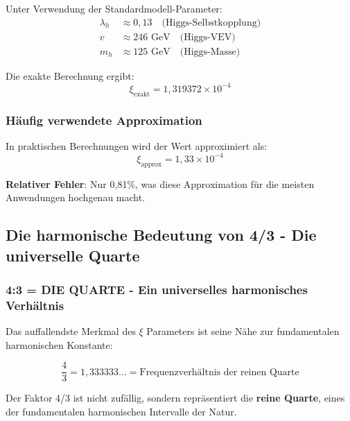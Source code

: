 	Unter Verwendung der Standardmodell-Parameter:
	\begin{align}
		\lambda_h &\approx 0{,}13 \quad \text{(Higgs-Selbstkopplung)} \\
		v &\approx 246 \text{ GeV} \quad \text{(Higgs-VEV)} \\
		m_h &\approx 125 \text{ GeV} \quad \text{(Higgs-Masse)}
	\end{align}
	
	Die exakte Berechnung ergibt:
	\begin{equation}
		\xi_{\text{exakt}} = 1{,}319372 \times 10^{-4}
		\label{eq:xi_exakt}
	\end{equation}
	
	\subsubsection{Häufig verwendete Approximation}
	\label{subsubsec:approximation}
	
	In praktischen Berechnungen wird der Wert approximiert als:
	\begin{equation}
		\xi_{\text{approx}} = 1{,}33 \times 10^{-4}
		\label{eq:xi_approx}
	\end{equation}
	
	\textbf{Relativer Fehler}: Nur 0{,}81\%, was diese Approximation für die meisten Anwendungen hochgenau macht.
	
	\subsection{Die harmonische Bedeutung von 4/3 - Die universelle Quarte}
	\label{subsec:vier_drittel_naehe}
	
	\subsubsection{4:3 = DIE QUARTE - Ein universelles harmonisches Verhältnis}
	\label{subsubsec:vier_drittel_verbindung}
	
	Das auffallendste Merkmal des $\xi$ Parameters ist seine Nähe zur fundamentalen harmonischen Konstante:
	
	\begin{equation}
		\frac{4}{3} = 1{,}333333\ldots = \text{Frequenzverhältnis der reinen Quarte}
		\label{eq:vier_drittel}
	\end{equation}
	
	Der Faktor 4/3 ist nicht zufällig, sondern repräsentiert die \textbf{reine Quarte}, eines der fundamentalen harmonischen Intervalle der Natur.
	
